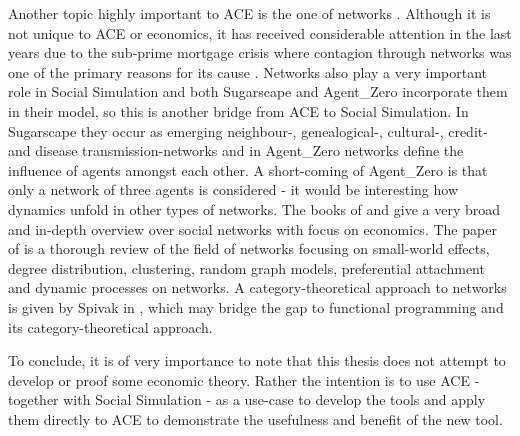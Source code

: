 Another topic highly important to ACE is the one of networks \cite{wilhite_economic_2006}. Although it is not unique to ACE or economics, it has received considerable attention in the last years due to the sub-prime mortgage crisis where contagion through networks was one of the primary reasons for its cause \cite{glasserman_contagion_2015}. Networks also play a very important role in Social Simulation and both Sugarscape \cite{epstein_growing_1996} and Agent\_Zero \cite{epstein_agent_zero:_2014} incorporate them in their model, so this is another bridge from ACE to Social Simulation. In Sugarscape they occur as emerging neighbour-, genealogical-, cultural-, credit- and disease transmission-networks and in Agent\_Zero networks define the influence of agents amongst each other. A short-coming of Agent\_Zero is that only a network of three agents is considered - it would be interesting how dynamics unfold in other types of networks. The books of \cite{jackson_social_2008} and \cite{easley_networks_2010} give a very broad and in-depth overview over social networks with focus on economics. The paper of \cite{newman_structure_2003} is a thorough review of the field of networks focusing on small-world effects, degree distribution, clustering, random graph models, preferential attachment and dynamic processes on networks. A category-theoretical approach to networks is given by Spivak in \cite{spivak_higher-dimensional_2009}, which may bridge the gap to functional programming and its category-theoretical approach.

To conclude, it is of very importance to note that this thesis does not attempt to develop or proof some economic theory. Rather the intention is to use ACE  - together with Social Simulation - as a use-case to develop the tools and apply them directly to ACE to demonstrate the usefulness and benefit of the new tool.